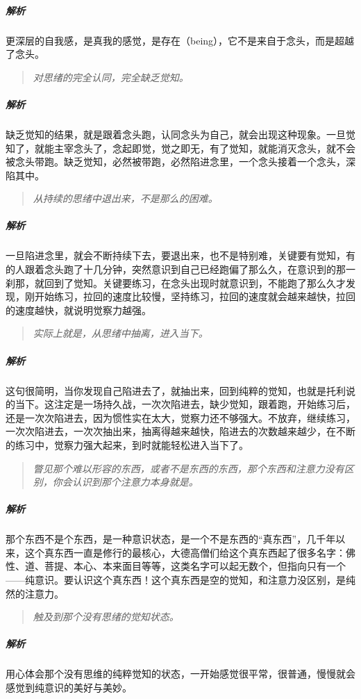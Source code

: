 \subparagraph{解析} 更深层的自我感，是真我的感觉，是存在（being），它不是来自于念头，而是超越了念头。

\begin{quote}\it
    对思绪的完全认同，完全缺乏觉知。
\end{quote}

\subparagraph{解析} 缺乏觉知的结果，就是跟着念头跑，认同念头为自己，就会出现这种现象。一旦觉知了，就能主宰念头了，念起即觉，觉之即无，有了觉知，就能消灭念头，就不会被念头带跑。缺乏觉知，必然被带跑，必然陷进念里，一个念头接着一个念头，深陷其中。

\begin{quote}\it
    从持续的思绪中退出来，不是那么的困难。
\end{quote}

\subparagraph{解析} 一旦陷进念里，就会不断持续下去，要退出来，也不是特别难，关键要有觉知，有的人跟着念头跑了十几分钟，突然意识到自己已经跑偏了那么久，在意识到的那一刹那，就回到了觉知。关键要练习，在念头出现时就意识到，不能跑了那么久才发现，刚开始练习，拉回的速度比较慢，坚持练习，拉回的速度就会越来越快，拉回的速度越快，就说明觉察力越强。

\begin{quote}\it
    实际上就是，从思绪中抽离，进入当下。
\end{quote}

\subparagraph{解析} 这句很简明，当你发现自己陷进去了，就抽出来，回到纯粹的觉知，也就是托利说的当下。这注定是一场持久战，一次次陷进去，缺少觉知，跟着跑，开始练习后，还是一次次陷进去，因为惯性实在太大，觉察力还不够强大。不放弃，继续练习，一次次陷进去，一次次抽出来，抽离得越来越快，陷进去的次数越来越少，在不断的练习中，觉察力强大起来，到时就能轻松进入当下了。

\begin{quote}\it
    瞥见那个难以形容的东西，或者不是东西的东西，那个东西和注意力没有区别，你会认识到那个注意力本身就是。
\end{quote}

\subparagraph{解析} 那个东西不是个东西，是一种意识状态，是一个不是东西的“真东西”，几千年以来，这个真东西一直是修行的最核心，大德高僧们给这个真东西起了很多名字：佛性、道、菩提、本心、本来面目等等，这类名字可以起无数个，但指向只有一个——纯意识。要认识这个真东西！这个真东西是空的觉知，和注意力没区别，是纯然的注意力。

\begin{quote}\it
    触及到那个没有思绪的觉知状态。
\end{quote}

\subparagraph{解析} 用心体会那个没有思维的纯粹觉知的状态，一开始感觉很平常，很普通，慢慢就会感觉到纯意识的美好与美妙。

